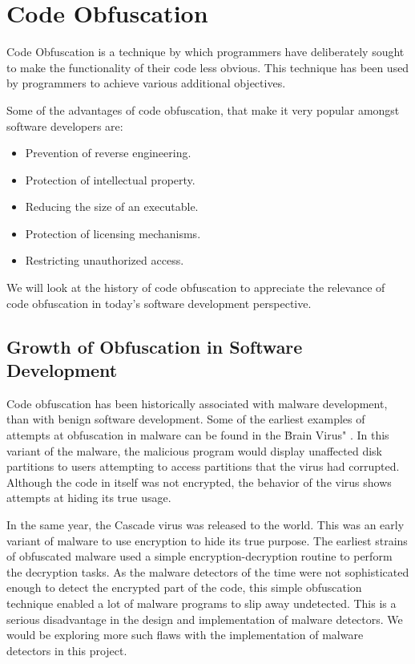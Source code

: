 \chapter{Code Obfuscation}

Code Obfuscation is a technique by which programmers have deliberately sought to make the functionality of their code less obvious. This technique has been used by programmers to achieve various additional objectives.

Some of the advantages of code obfuscation, that make it very popular amongst software developers are:

\begin{itemize}
	\item Prevention of reverse engineering.
	\item Protection of intellectual property.
	\item Reducing the size of an executable.
	\item Protection of licensing mechanisms.
	\item Restricting unauthorized access.
\end{itemize}


We will look at the history of code obfuscation to appreciate the relevance of code obfuscation in today's software development perspective.

\section{Growth of Obfuscation in Software Development}

Code obfuscation has been historically associated with malware development, than with benign software development. Some of the earliest examples of attempts at obfuscation in malware can be found in the \"Brain Virus" \cite{brain} . In this variant of the malware, the malicious program would display unaffected disk partitions to users attempting to access partitions that the virus had corrupted. Although the code in itself was not encrypted, the behavior of the virus shows attempts at hiding its true usage.

In the same year, the Cascade virus was released to the world. This was an early variant of malware to use encryption to hide its true purpose. The earliest strains of obfuscated malware used a simple encryption-decryption routine to perform the decryption tasks. As the malware detectors of the time were not sophisticated enough to detect the encrypted part of the code, this simple obfuscation technique enabled a lot of malware programs to slip away undetected. This is a serious disadvantage in the design and implementation of malware detectors. We would be exploring more such flaws with the implementation of malware detectors in this project.

